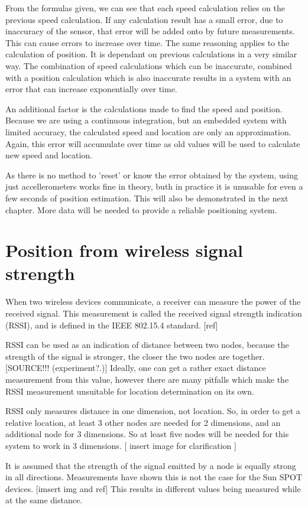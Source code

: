 \documentclass[twoside, 11pt]{uva-bachelor-thesis}
\begin{document}
From the formulas given, we can see that each speed calculation relies on the previous speed calculation. If any calculation result has a small error, due to inaccuracy of the sensor, that error will be added onto by future measurements. This can cause errors to increase over time. The same reasoning applies to the calculation of position. It is dependant on previous calculations in a very similar way. The combination of speed calculations which can be inaccurate, combined with a position calculation which is also inaccurate results in a system with an error that can increase exponentially over time. 

An additional factor is the calculations made to find the speed and position. Because we are using a continuous integration, but an embedded system with limited accuracy, the calculated speed and location are only an approximation. Again, this error will accumulate over time as old values will be used to calculate new speed and location.

As there is no method to 'reset' or know the error obtained by the system, using just accellerometers works fine in theory, buth in practice it is unusable for even a few seconds of position estimation. This will also be demonstrated in the next chapter. More data will be needed to provide a reliable positioning system.
\section{Position from wireless signal strength}
When two wireless devices communicate, a receiver can measure the power of the received signal. This measurement is called the received signal strength indication (RSSI), and is defined in the IEEE 802.15.4 standard. [ref]

RSSI can be used as an indication of distance between two nodes, because the strength of the signal is stronger, the closer the two nodes are together. [SOURCE!!! (experiment?.)] Ideally, one can get a rather exact distance measurement from this value, however there are many pitfalls which make the RSSI measurement unsuitable for location determination on its own.

RSSI only measures distance in one dimension, not location. So, in order to get a relative location, at least 3 other nodes are needed for 2 dimensions, and an additional node for 3 dimensions. So at least five nodes will be needed for this system to work in 3 dimensions.
  [ insert image for clarification ]
  
It is assumed that the strength of the signal emitted by a node is equally strong in all directions. Measurements have shown this is not the case for the Sun SPOT devices.  [imsert img and ref] This results in different values being measured while at the same distance.
\end{document}
